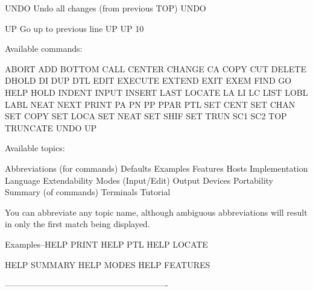 UNDO      Undo all changes (from previous TOP)        UNDO
 
UP        Go up to previous line                      UP
                                                      UP 10
 
 
   Available commands:
 
      ABORT     ADD
      BOTTOM
      CALL      CENTER    CHANGE    CA        COPY      CUT
      DELETE    DHOLD     DI        DUP       DTL
      EDIT      EXECUTE   EXTEND    EXIT      EXEM
      FIND
      GO
      HELP      HOLD
      INDENT    INPUT     INSERT
      LAST      LOCATE    LA      LI        LC        LIST
                LOBL      LABL
      NEAT      NEXT
      PRINT     PA        PN        PP        PPAR      PTL
      SET CENT  SET CHAN  SET COPY  SET LOCA
      SET NEAT  SET SHIF  SET TRUN  SC1       SC2
      TOP       TRUNCATE
      UNDO      UP
 
   Available topics:
 
      Abbreviations (for commands)
      Defaults
      Examples
      Features
      Hosts
      Implementation
      Language Extendability
      Modes (Input/Edit)
      Output Devices
      Portability
      Summary (of commands)
      Terminals
      Tutorial
 
   You can  abbreviate any topic name, although
   ambiguous abbreviations will result in only
   the first match being displayed.
 
   Examples--HELP PRINT
             HELP PTL
             HELP LOCATE
 
             HELP SUMMARY
             HELP MODES
             HELP FEATURES
 
----------------------------------------------------------
 
 
 
 
 
 
 
 
 
 
 
 
 
 
 
 
 
 
 
 
 
 
 
 
 
 
 
 
 
 
 
 
 
 
 
 
 
